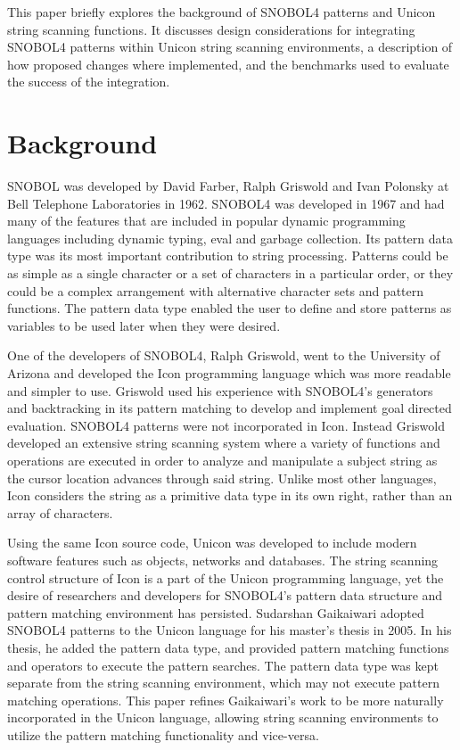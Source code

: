 \documentclass{article}
\begin{document}
This paper briefly explores the background of SNOBOL4 patterns and Unicon string scanning functions.  It discusses design considerations for integrating SNOBOL4 patterns within Unicon string scanning environments, a description of how proposed changes where implemented, and the benchmarks used to evaluate the success of the integration.

\section{Background}
SNOBOL was developed by David Farber, Ralph Griswold and Ivan Polonsky at Bell Telephone Laboratories in 1962.  SNOBOL4 was developed in 1967 and had many of the features that are included in popular dynamic programming languages including dynamic typing, eval and garbage collection.  Its pattern data type was its most important contribution to string processing.  Patterns could be as simple as a single character or a set of characters in a particular order, or they could be a complex arrangement with alternative character sets and pattern functions.  The pattern data type enabled the user to define and store patterns as variables to be used later when they were desired.\cite{Snobol}  

One of the developers of SNOBOL4, Ralph Griswold, went to the University of Arizona and developed the Icon programming language which was more readable and simpler to use.\cite{JefferyUnicon}  Griswold used his experience with SNOBOL4's generators and backtracking in its pattern matching to develop and implement goal directed evaluation.\cite{Gaikaiwari2005}  SNOBOL4 patterns were not incorporated in Icon.  Instead Griswold developed an extensive string scanning system where a variety of functions and operations are executed in order to analyze and manipulate a subject string as the cursor location advances through said string.  Unlike most other languages, Icon considers the string as a primitive data type in its own right, rather than an array of characters. \cite{GriswoldIcon}  

Using the same Icon source code, Unicon was developed to include modern software features such as objects, networks and databases. \cite{JefferyUnicon} The string scanning control structure of Icon is a part of the Unicon programming language, yet the desire of researchers and developers for SNOBOL4's pattern data structure and pattern matching environment has persisted.  Sudarshan Gaikaiwari adopted SNOBOL4 patterns to the Unicon language for his master's thesis in 2005.  In his thesis, he added the pattern data type, and provided pattern matching functions and operators to execute the pattern searches.\cite{Gaikaiwari2005}  The pattern data type was kept separate from the string scanning environment, which may not execute pattern matching operations.  This paper refines Gaikaiwari's work to be more naturally incorporated in the Unicon language, allowing string scanning environments to utilize the pattern matching functionality and vice-versa.
\end{document}
